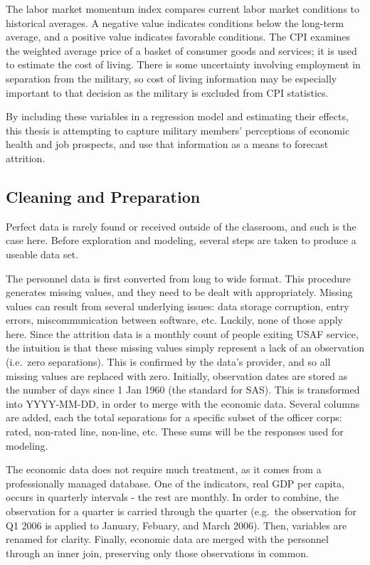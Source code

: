 \documentclass[12pt,letterpaper,toc=flat,oneside]{report}
\theoremstyle{definition}
\theoremstyle{definition}
\theoremstyle{definition}
\theoremstyle{remark}
\begin{document}
The labor market momentum index compares current labor market conditions
to historical averages. A negative value indicates conditions below the
long-term average, and a positive value indicates favorable conditions.
The CPI examines the weighted average price of a basket of consumer
goods and services; it is used to estimate the cost of living. There is
some uncertainty involving employment in separation from the military,
so cost of living information may be especially important to that
decision as the military is excluded from CPI statistics.

By including these variables in a regression model and estimating their
effects, this thesis is attempting to capture military members'
perceptions of economic health and job prospects, and use that
information as a means to forecast attrition.

\hypertarget{cleaning-and-preparation}{%
\subsection{Cleaning and Preparation}\label{cleaning-and-preparation}}

Perfect data is rarely found or received outside of the classroom, and
such is the case here. Before exploration and modeling, several steps
are taken to produce a useable data set.

The personnel data is first converted from long to wide format. This
procedure generates missing values, and they need to be dealt with
appropriately. Missing values can result from several underlying issues:
data storage corruption, entry errors, miscommunication between
software, etc. Luckily, none of those apply here. Since the attrition
data is a monthly count of people exiting USAF service, the intuition is
that these missing values simply represent a lack of an observation
(i.e.~zero separations). This is confirmed by the data's provider, and
so all missing values are replaced with zero. Initially, observation
dates are stored as the number of days since 1 Jan 1960 (the standard
for SAS). This is transformed into YYYY-MM-DD, in order to merge with
the economic data. Several columns are added, each the total separations
for a specific subset of the officer corps: rated, non-rated line,
non-line, etc. These sums will be the responses used for modeling.

The economic data does not require much treatment, as it comes from a
professionally managed database. One of the indicators, real GDP per
capita, occurs in quarterly intervals - the rest are monthly. In order
to combine, the observation for a quarter is carried through the quarter
(e.g.~the observation for Q1 2006 is applied to January, Febuary, and
March 2006). Then, variables are renamed for clarity. Finally, economic
data are merged with the personnel through an inner join, preserving
only those observations in common.
\end{document}
